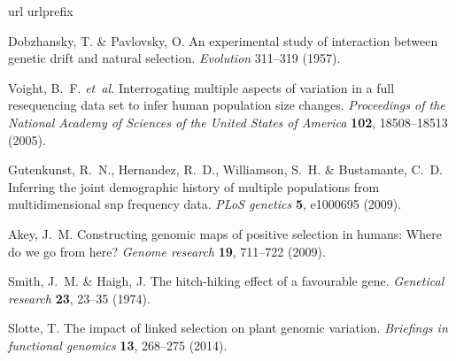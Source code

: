 \documentclass[12pt,a4paper]{article}
\begin{document}
\begin{thebibliography}{10}
\expandafter\ifx\csname url\endcsname\relax
  \def\url#1{\texttt{#1}}\fi
\expandafter\ifx\csname urlprefix\endcsname\relax\def\urlprefix{URL }\fi
\providecommand{\bibinfo}[2]{#2}
\providecommand{\eprint}[2][]{\url{#2}}

\bibinfo{author}{Dobzhansky, T.} \& \bibinfo{author}{Pavlovsky, O.}
\newblock \bibinfo{title}{An experimental study of interaction between genetic
  drift and natural selection}.
\newblock \emph{\bibinfo{journal}{Evolution}} \bibinfo{pages}{311--319}
  (\bibinfo{year}{1957}).

\bibinfo{author}{Voight, B.~F.} \emph{et~al.}
\newblock \bibinfo{title}{Interrogating multiple aspects of variation in a full
  resequencing data set to infer human population size changes}.
\newblock \emph{\bibinfo{journal}{Proceedings of the National Academy of
  Sciences of the United States of America}} \textbf{\bibinfo{volume}{102}},
  \bibinfo{pages}{18508--18513} (\bibinfo{year}{2005}).

\bibinfo{author}{Gutenkunst, R.~N.}, \bibinfo{author}{Hernandez, R.~D.},
  \bibinfo{author}{Williamson, S.~H.} \& \bibinfo{author}{Bustamante, C.~D.}
\newblock \bibinfo{title}{Inferring the joint demographic history of multiple
  populations from multidimensional snp frequency data}.
\newblock \emph{\bibinfo{journal}{PLoS genetics}} \textbf{\bibinfo{volume}{5}},
  \bibinfo{pages}{e1000695} (\bibinfo{year}{2009}).

\bibinfo{author}{Akey, J.~M.}
\newblock \bibinfo{title}{Constructing genomic maps of positive selection in
  humans: Where do we go from here?}
\newblock \emph{\bibinfo{journal}{Genome research}}
  \textbf{\bibinfo{volume}{19}}, \bibinfo{pages}{711--722}
  (\bibinfo{year}{2009}).

\bibinfo{author}{Smith, J.~M.} \& \bibinfo{author}{Haigh, J.}
\newblock \bibinfo{title}{The hitch-hiking effect of a favourable gene}.
\newblock \emph{\bibinfo{journal}{Genetical research}}
  \textbf{\bibinfo{volume}{23}}, \bibinfo{pages}{23--35}
  (\bibinfo{year}{1974}).

\bibinfo{author}{Slotte, T.}
\newblock \bibinfo{title}{The impact of linked selection on plant genomic
  variation}.
\newblock \emph{\bibinfo{journal}{Briefings in functional genomics}}
  \textbf{\bibinfo{volume}{13}}, \bibinfo{pages}{268--275}
  (\bibinfo{year}{2014}).


\end{thebibliography}
\end{document}
